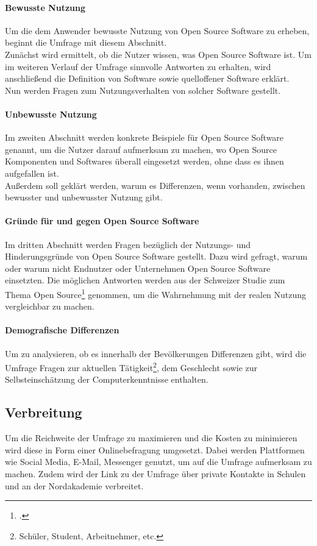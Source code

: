 \documentclass[a4paper]{article}
\begin{document}
			\paragraph{Bewusste Nutzung}
				Um die dem Anwender bewusste Nutzung von Open Source Software zu erheben, beginnt die Umfrage mit diesem Abschnitt.\\
				Zunächst wird ermittelt, ob die Nutzer wissen, was Open Source Software ist. Um im weiteren Verlauf der Umfrage sinnvolle Antworten zu erhalten, wird anschließend die Definition von Software sowie quelloffener Software erklärt.\\
				Nun werden Fragen zum Nutzungsverhalten von solcher Software gestellt.
			
			\paragraph{Unbewusste Nutzung}
				Im zweiten Abschnitt werden konkrete Beispiele für Open Source Software genannt, um die Nutzer darauf aufmerksam zu machen, wo Open Source Komponenten und Softwares überall eingesetzt werden, ohne dass es ihnen aufgefallen ist.\\
				Außerdem soll geklärt werden, warum es Differenzen, wenn vorhanden, zwischen bewusster und unbewusster Nutzung gibt.
			
			\paragraph{Gründe für und gegen Open Source Software}
				Im dritten Abschnitt werden Fragen bezüglich der Nutzungs- und Hinderungsgründe von Open Source Software gestellt. Dazu wird gefragt, warum oder warum nicht Endnutzer oder Unternehmen Open Source Software einsetzten. Die möglichen Antworten werden aus der Schweizer Studie zum Thema Open Source\footcite{oss:studie} genommen, um die Wahrnehmung mit der realen Nutzung vergleichbar zu machen.
			
			\paragraph{Demografische Differenzen}
				Um zu analysieren, ob es innerhalb der Bevölkerungen Differenzen gibt, wird die Umfrage Fragen zur aktuellen Tätigkeit\footnote{Schüler, Student, Arbeitnehmer, etc.}, dem Geschlecht sowie zur Selbsteinschätzung der Computerkenntnisse enthalten.
				
		\subsection{Verbreitung}
			Um die Reichweite der Umfrage zu maximieren und die Kosten zu minimieren wird diese in Form einer Onlinebefragung umgesetzt. Dabei werden Plattformen wie Social Media, E-Mail, Messenger genutzt, um auf die Umfrage aufmerksam zu machen. Zudem wird der Link zu der Umfrage über private Kontakte in Schulen und an der Nordakademie verbreitet.
	   
\end{document}
